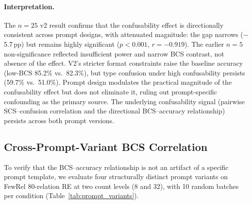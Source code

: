 \documentclass[11pt]{article}
\begin{document}
\paragraph{Interpretation.}
The $n{=}25$ v2 result confirms that the confusability effect is directionally consistent across prompt designs, with attenuated magnitude: the gap narrows ($-$5.7\,pp) but remains highly significant ($p < 0.001$, $r = -0.919$). The earlier $n{=}5$ non-significance reflected insufficient power and narrow BCS contrast, not absence of the effect. V2's stricter format constraints raise the baseline accuracy (low-BCS 85.2\% vs.\ 82.3\%), but type confusion under high confusability persists (59.7\% vs.\ 51.0\%). Prompt design modulates the practical magnitude of the confusability effect but does not eliminate it, ruling out prompt-specific confounding as the primary source. The underlying confusability signal (pairwise SCS--confusion correlation and the directional BCS--accuracy relationship) persists across both prompt versions.

\subsection{Cross-Prompt-Variant BCS Correlation}
\label{sec:appendix_prompt_variants}

To verify that the BCS--accuracy relationship is not an artifact of a specific prompt template, we evaluate four structurally distinct prompt variants on FewRel 80-relation RE at two count levels (8 and 32), with 10 random batches per condition (Table~\ref{tab:prompt_variants}).

\begin{table}[h]
\centering
\small
\caption{BCS--accuracy Pearson correlation across four prompt variants. At count 32, all four variants show negative BCS--accuracy correlations ($r \leq -0.47$), with two reaching $p < 0.05$. At count 8, the narrower BCS range reduces statistical power.}
\label{tab:prompt_variants}
\end{table}
\end{document}
